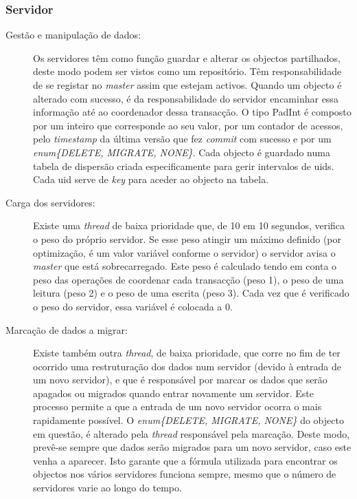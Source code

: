 \subsubsection{Servidor}

\begin{description}

\item[Gestão e manipulação de dados:]
Os servidores têm como função guardar e alterar os objectos partilhados, deste modo podem ser vistos como um repositório. Têm responsabilidade de se registar no \textit{master} assim que estejam activos. Quando um objecto é alterado com sucesso, é da responsabilidade do servidor encaminhar essa informação até ao coordenador dessa transacção. O tipo PadInt é composto por um inteiro que corresponde ao seu valor, por um contador de acessos, pelo \textit{timestamp} da última versão que fez \textit{commit} com sucesso e por um \textit{enum\{DELETE, MIGRATE, NONE\}}. Cada objecto é guardado numa  tabela de dispersão criada especificamente para gerir intervalos de uids. Cada uid serve de \textit{key} para aceder ao objecto na tabela.

\item[Carga dos servidores:]
Existe uma \textit{thread} de baixa prioridade que, de 10 em 10 segundos, verifica o peso do próprio servidor. Se esse peso atingir um máximo definido (por optimização, é um valor variável conforme o servidor) o servidor avisa o \textit{master} que está sobrecarregado. Este peso é calculado tendo em conta o peso das operações de coordenar cada transacção (peso 1), o peso de uma leitura (peso 2) e o peso de uma escrita (peso 3). Cada vez que é verificado o peso do servidor, essa variável é colocada a 0.

\item[Marcação de dados a migrar:]
Existe também outra \textit{thread}, de baixa prioridade, que corre no fim de ter ocorrido uma restruturação dos dados num servidor (devido à entrada de um novo servidor), e que é responsável por marcar os dados que serão apagados ou migrados quando entrar novamente um servidor. Este processo permite a que a entrada de um novo servidor ocorra o mais rapidamente possível. O \textit{enum\{DELETE, MIGRATE, NONE\}} do objecto em questão, é alterado pela \textit{thread} responsável pela marcação. Deste modo, prevê-se sempre que dados serão migrados para um novo servidor, caso este venha a aparecer. Isto garante que a fórmula utilizada para encontrar os objectos nos vários servidores funciona sempre, mesmo que o número de servidores varie ao longo do tempo.


\end{description}
